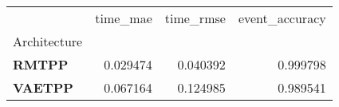 \begin{tabular}{lrrr}
\toprule
 & time_mae & time_rmse & event_accuracy \\
Architecture &  &  &  \\
\midrule
\textbf{RMTPP} & 0.029474 & 0.040392 & 0.999798 \\
\textbf{VAETPP} & 0.067164 & 0.124985 & 0.989541 \\
\bottomrule
\end{tabular}
